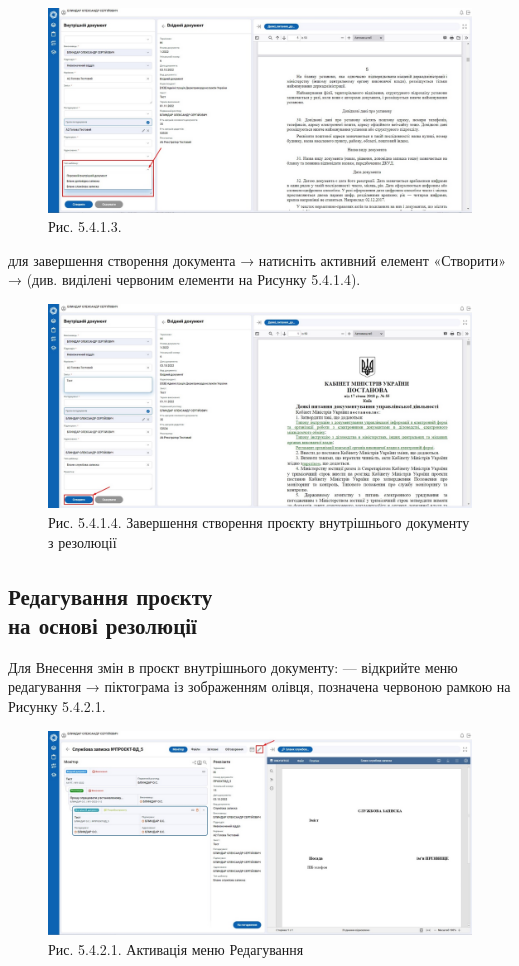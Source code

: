 \begin{figure}[!htbp]
\centerline{\includegraphics[width=\textwidth]{img/5.4.1.3.jpg}}
\caption{Рис. 5.4.1.3. }
\end{figure}

для завершення створення документа → натисніть активний елемент
«Створити» → (див. виділені червоним елементи на Рисунку 5.4.1.4).

\begin{figure}[!htbp]
\centerline{\includegraphics[width=\textwidth]{img/5.4.1.4.jpg}}
\caption{Рис. 5.4.1.4. Завершення створення проєкту внутрішнього документу з резолюції}
\end{figure}

\subsection{Редагування проєкту \\ на основі резолюції}

Для Внесення змін в проєкт внутрішнього документу:
--- відкрийте меню редагування → піктограма із зображенням олівця,
позначена червоною рамкою на Рисунку 5.4.2.1.

\begin{figure}[!htbp]
\centerline{\includegraphics[width=\textwidth]{img/5.4.2.1.jpg}}
\caption{Рис. 5.4.2.1. Активація меню Редагування}
\end{figure}

